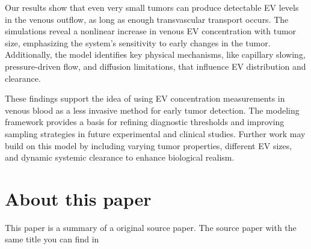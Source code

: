 \documentclass[sigconf]{acmart}
\begin{document}
Our results show that even very small tumors can produce detectable EV levels in the venous outflow, as long as enough transvascular transport occurs. The simulations reveal a nonlinear increase in venous EV concentration with tumor size, emphasizing the system's sensitivity to early changes in the tumor. Additionally, the model identifies key physical mechanisms, like capillary slowing, pressure-driven flow, and diffusion limitations, that influence EV distribution and clearance.

These findings support the idea of using EV concentration measurements in venous blood as a less invasive method for early tumor detection. The modeling framework provides a basis for refining diagnostic thresholds and improving sampling strategies in future experimental and clinical studies. Further work may build on this model by including varying tumor properties, different EV sizes, and dynamic systemic clearance to enhance biological realism.





\appendix

\section{About this paper}
This paper is a summary of a original source paper. The source paper with the same title you can find in \cite{Zoofaghari_2023}
\end{document}

